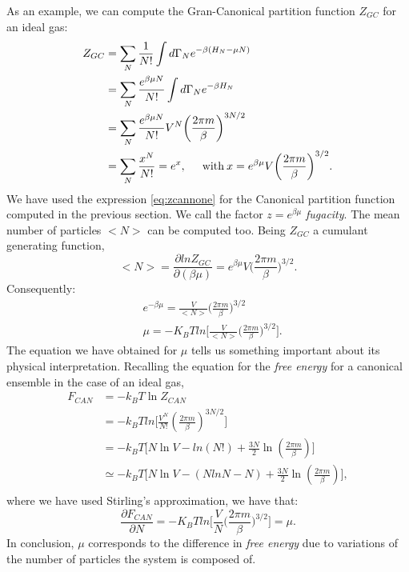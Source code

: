 As an example, we can compute the Gran-Canonical partition function $Z_{GC}$ for an ideal gas:
\begin{equation}
    \begin{split}
    Z_{GC} &= \sum_N \frac{1}{N!}\int d\Gamma_N e^{-\beta(H_N-\mu N)}\\
    &=\sum_N \frac{e^{\beta \mu N}}{N!}\int d\Gamma_N e^{-\beta H_N}\\
    &=\sum_N \frac{e^{\beta \mu N}}{N!}V^N\biggl( \frac{2\pi m}{\beta}\biggr)^{3N/2}\\
    &=\sum_N \frac{x^N}{N!}=e^x, \hspace{0.5 cm} \text{with} \:x=e^{\beta \mu}V \biggl(\frac{2\pi m}{\beta}\biggr)^{3/2}.
    \end{split}
\end{equation}
We have used the expression \ref{eq:zcannone} for the Canonical partition function computed in the previous section. We call the factor $z=e^{\beta \mu}$ \textit{fugacity}. The mean number of particles $<N>$ can be computed too. Being $Z_{GC}$ a cumulant generating function, 
\begin{equation}
    <N>=\frac{\partial ln Z_{GC}}{\partial (\beta \mu)}
    =e^{\beta \mu}V \biggl(\frac{2\pi     m}{\beta}\biggr)^{3/2}. \label{eq.N}
\end{equation}
Consequently:
\begin{equation}
   \begin{split}
    & e^{-\beta \mu}=\frac{V}{<N>}\biggl(\frac{2\pi m}{\beta}\biggr)^{3/2} \\
    & \mu=-K_B T ln \biggl[\frac{V}{<N>}\biggl(\frac{2\pi m}{\beta}\biggr)^{3/2} \biggr].
    \end{split}
\end{equation}
The equation we have obtained for $\mu$ tells us something important about its physical interpretation. Recalling the equation for the \textit{free energy} for a canonical ensemble in the case of an ideal gas,
\begin{equation}
    \begin{split}
    F_{CAN}&=-k_B T \ln{Z_{CAN}}\\
    &=-k_B T ln\biggl[ \frac{V^N}{N!}\left(\frac{2\pi m}{\beta} \right)^{3N/2}\biggr]\\
    &=-k_B T \biggl[N\ln{V}-ln(N!)+\frac{3N}{2}\ln{\left(\frac{2\pi m}{\beta} \right)}\biggr]\\
    &\simeq -k_B T \biggl[N\ln{V}-(NlnN-N)+\frac{3N}{2}\ln{\left(\frac{2\pi m}{\beta} \right)}\biggr],\\
    \end{split}
\end{equation}
where we have used Stirling's approximation, we have that:
\begin{equation}
   \frac{\partial F_{CAN}}{\partial N}=-K_B T ln \biggl[\frac{V}{N}\biggl(\frac{2\pi m}{\beta}\biggr)^{3/2} \biggr]=\mu.
\end{equation}
In conclusion, $\mu$ corresponds to the difference in \textit{free energy} due to variations of the number of particles the system is composed of.

